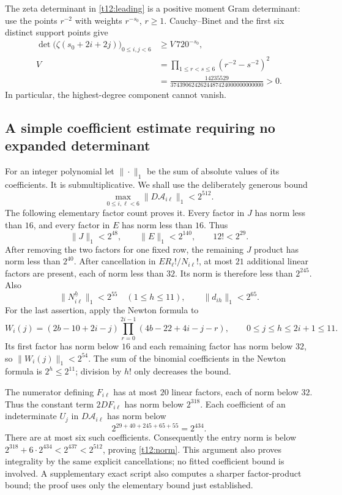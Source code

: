 \documentclass[11pt,letterpaper]{article}
\numberwithin{equation}{section}
\theoremstyle{definition}
\theoremstyle{remark}
\begin{document}
The zeta determinant in \eqref{t12:leading} is a positive moment
Gram determinant: use the points $r^{-2}$ with weights $r^{-s_0}$,
$r\ge1$. Cauchy--Binet and the first six distinct support points give
\begin{equation}\label{t12:zeta-lower}
 \begin{aligned}
 \det\bigl(\zeta(s_0+2i+2j)\bigr)_{0\le i,j<6}
 &\ge V\,720^{-s_0},\\
 V&=\prod_{1\le r<s\le6}(r^{-2}-s^{-2})^2\\
 &=\frac{14235529}{3743906242624487424000000000000}>0.
 \end{aligned}
\end{equation}
In particular, the highest-degree component cannot vanish.

\subsection{A simple coefficient estimate requiring no expanded determinant}

For an integer polynomial let $\|\cdot\|_1$ be the sum of absolute
values of its coefficients. It is submultiplicative. We shall use
the deliberately generous bound
\begin{equation}\label{t12:norm}
 \max_{0\le i,\ell<6}\|D\mathcal A_{i\ell}\|_1<2^{512}.
\end{equation}
The following elementary factor count proves it.
Every factor in $J$ has norm less than $16$, and every factor in $E$
has norm less than $16$. Thus
\[
 \|J\|_1<2^{48},\qquad\|E\|_1<2^{140},\qquad12!<2^{29}.
\]
After removing the two factors for one fixed row, the remaining
$J$ product has norm less than $2^{40}$. After cancellation in
$ER_\ell!/N_{i\ell}!$, at most $21$ additional linear factors are
present, each of norm less than $32$. Its norm is therefore less
than $2^{245}$. Also
\[
 \|N_{i\ell}^{\underline h}\|_1<2^{55}
 \quad(1\le h\le11),\qquad
 \|d_{ih}\|_1<2^{65}.
\]
For the last assertion, apply the Newton formula to
\[
 W_i(j)=(2b-10+2i-j)
             \prod_{r=0}^{2i-1}(4b-22+4i-j-r),
 \qquad0\le j\le h\le2i+1\le11.
\]
Its first factor has norm below $16$ and each remaining factor
has norm below $32$, so $\|W_i(j)\|_1<2^{54}$. The sum of the
binomial coefficients in the Newton formula is $2^h\le2^{11}$;
division by $h!$ only decreases the bound.

The numerator defining $F_{i\ell}$ has at most $20$ linear factors,
each of norm below $32$. Thus the constant term $2DF_{i\ell}$ has
norm below $2^{318}$. Each coefficient of an indeterminate $U_j$
in $D\mathcal A_{i\ell}$ has norm below
\[
 2^{29+40+245+65+55}=2^{434}.
\]
There are at most six such coefficients. Consequently the entry norm
is below $2^{318}+6\cdot2^{434}<2^{437}<2^{512}$, proving
\eqref{t12:norm}. This argument also proves integrality by the same
explicit cancellations; no fitted coefficient bound is involved.
A supplementary exact script also computes a sharper factor-product
bound; the proof uses only the elementary bound just established.
\end{document}
